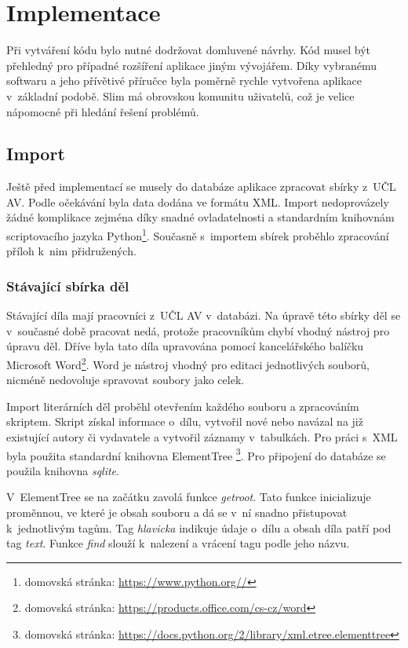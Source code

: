 \chapter{Implementace}
    Při vytváření kódu bylo nutné dodržovat domluvené návrhy. Kód musel být přehledný pro případné rozšíření aplikace jiným vývojářem. Díky vybranému softwaru a jeho přívětivé příručce byla poměrně rychle vytvořena aplikace v~základní podobě. Slim má obrovskou komunitu uživatelů, což je velice nápomocné při hledání řešení problémů. 

    \section{Import}
        Ještě před implementací se musely do databáze aplikace zpracovat sbírky z~UČL AV. Podle očekávání byla data dodána ve formátu XML. Import nedoprovázely žádné komplikace zejména díky snadné ovladatelnosti a standardním knihovnám scriptovacího jazyka Python\footnote{domovská stránka: \url{https://www.python.org//}}. Současně s~importem sbírek proběhlo zpracování příloh k~nim přidružených.
        
        \subsection{Stávající sbírka děl}
            Stávající díla mají pracovníci z~UČL AV v~databázi. Na úpravě této sbírky děl se v~současné době pracovat nedá, protože pracovníkům chybí vhodný nástroj pro úpravu děl. Dříve byla tato díla upravována pomocí kancelářského balíčku Microsoft Word\footnote{domovská stránka: \url{https://products.office.com/cs-cz/word}}. Word je nástroj vhodný pro editaci jednotlivých souborů, nicméně nedovoluje spravovat soubory jako celek.
            
            Import literárních děl proběhl otevřením každého souboru a zpracováním skriptem. Skript získal informace o~dílu, vytvořil nové nebo navázal na již existující autory či vydavatele a vytvořil záznamy v~tabulkách. Pro práci s~XML byla použita standardní knihovna ElementTree
            \footnote{domovská stránka: \href{https://docs.python.org/2/library/xml.etree .elementtree.html}{\url{ https://docs.python.org/2/library/xml.etree.elementtree}}}. Pro připojení do databáze se použila knihovna \textit{sqlite}.
            
            V~ElementTree se na začátku zavolá funkce \textit{getroot}. Tato funkce inicializuje proměnnou, ve které je obsah souboru a  dá se v~ní snadno přistupovat k~jednotlivým tagům. Tag \textit{hlavicka} indikuje údaje o~dílu a obsah díla patří pod tag \textit{text}. Funkce \textit{find} slouží k~nalezení a vrácení tagu podle jeho názvu.
            
